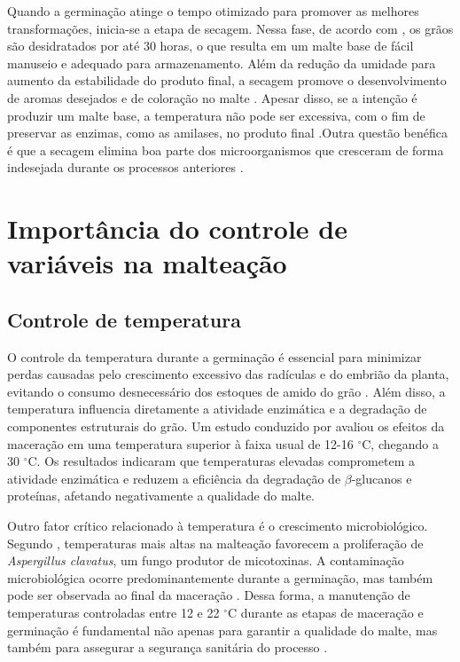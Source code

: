 Quando a germinação atinge o tempo otimizado para promover as melhores transformações, inicia-se a etapa de secagem. Nessa fase, de acordo com , os grãos são desidratados por até 30 horas, o que resulta em um malte base de fácil manuseio e adequado para armazenamento. Além da redução da umidade para aumento da estabilidade do produto final, a secagem promove o desenvolvimento de aromas desejados e de coloração no malte \cite{BAMFORTH2003}. Apesar disso, se a intenção é produzir um malte base, a temperatura não pode ser excessiva, com o fim de preservar as enzimas, como as amilases, no produto final \cite{LEWIS2012}.Outra questão benéfica é que a secagem elimina boa parte dos microorganismos que cresceram de forma indesejada durante os processos anteriores \cite{DOUGLAS1988, PETTERS1988}. 


\section{Importância do controle de variáveis na malteação}

\subsection{Controle de temperatura}

O controle da temperatura durante a germinação é essencial para minimizar perdas causadas pelo crescimento excessivo das radículas e do embrião da planta, evitando o consumo desnecessário dos estoques de amido do grão \cite{PITZ1990, MALLETT2022}. Além disso, a temperatura influencia diretamente a atividade enzimática e a degradação de componentes estruturais do grão. Um estudo conduzido por  avaliou os efeitos da maceração em uma temperatura superior à faixa usual de 12-16 $^{\circ}$C, chegando a 30 $^{\circ}$C. Os resultados indicaram que temperaturas elevadas comprometem a atividade enzimática e reduzem a eficiência da degradação de $\beta$-glucanos e proteínas, afetando negativamente a qualidade do malte.

Outro fator crítico relacionado à temperatura é o crescimento microbiológico. Segundo , temperaturas mais altas na malteação favorecem a proliferação de \textit{Aspergillus clavatus}, um fungo produtor de micotoxinas. A contaminação microbiológica ocorre predominantemente durante a germinação, mas também pode ser observada ao final da maceração \cite{PETTERS1988}. Dessa forma, a manutenção de temperaturas controladas entre 12 e 22 $^{\circ}$C durante as etapas de maceração e germinação é fundamental não apenas para garantir a qualidade do malte, mas também para assegurar a segurança sanitária do processo \cite{TANGNI2002}.

